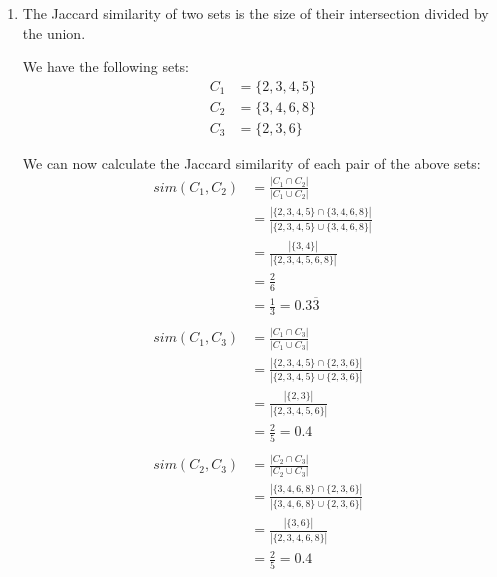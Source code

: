 \documentclass{article}
\begin{document}
    \begin{enumerate}[label=\alph*., left=10pt, itemsep=10pt]

        \item \begin{minipage}[t]{0.9\textwidth}
            The Jaccard similarity of two sets is the size of their intersection divided by the union.
            
            We have the following sets:
            \begin{align*}
                C_{1} &= \{2,3,4,5\}\\
                C_{2} &= \{3,4,6,8\}\\
                C_{3} &= \{2,3,6\}
            \end{align*}
            
            We can now calculate the Jaccard similarity of each pair of the above sets:
            \begin{align*}
                sim(C_{1},C_{2}) &= \frac{|C_{1} \cap C_{2}|}{|C_{1} \cup C_{2}|}\\
                                 &= \frac{|\{2,3,4,5\} \cap \{3,4,6,8\}|}{|\{2,3,4,5\} \cup \{3,4,6,8\}|}\\
                                 &= \frac{|\{3,4\}|}{|\{2,3,4,5,6,8\}|}\\
                                 &= \frac{2}{6}\\
                                 &= \frac{1}{3} = 0.3\overline{3}\\
                \\
                sim(C_{1},C_{3}) &= \frac{|C_{1} \cap C_{3}|}{|C_{1} \cup C_{3}|}\\
                                 &= \frac{|\{2,3,4,5\} \cap \{2,3,6\}|}{|\{2,3,4,5\} \cup \{2,3,6\}|}\\
                                 &= \frac{|\{2,3\}|}{|\{2,3,4,5,6\}|}\\
                                 &= \frac{2}{5} = 0.4\\
                \\
                sim(C_{2},C_{3}) &= \frac{|C_{2} \cap C_{3}|}{|C_{2} \cup C_{3}|}\\
                                 &= \frac{|\{3,4,6,8\} \cap \{2,3,6\}|}{|\{3,4,6,8\} \cup \{2,3,6\}|}\\
                                 &= \frac{|\{3,6\}|}{|\{2,3,4,6,8\}|}\\
                                 &= \frac{2}{5} = 0.4\\

\end{align*}
\end{minipage}
\end{enumerate}
\end{document}
